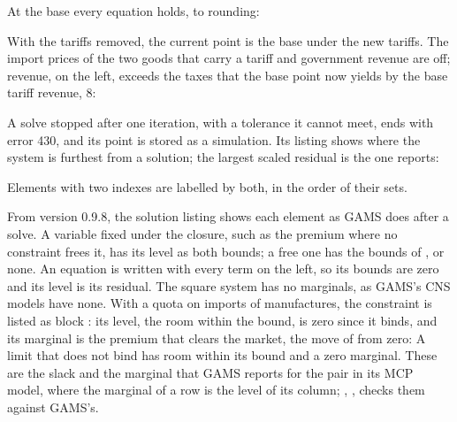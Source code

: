 At the base every equation holds, to rounding:


With the tariffs removed, the current point is the base under the new
tariffs. The import prices of the two goods that carry a tariff and
government revenue are off; revenue, on the left, exceeds the taxes that the
base point now yields by the base tariff revenue, 8:


A solve stopped after one iteration, with a tolerance it cannot meet, ends
with error 430, and its point is stored as a simulation. Its listing shows where the system is furthest from a
solution; the largest scaled residual is the one  reports:


Elements with two indexes are labelled by both, in the order of their sets.


From version 0.9.8, the solution listing shows each element as GAMS does
after a solve. A variable fixed under the closure, such as the premium
 where no constraint frees it, has its level as both bounds; a free one
has the bounds of , or none. An equation is written with
every term on the left, so its bounds are zero and its level is its residual.
The square system has no marginals, as GAMS's CNS models have none. With a
quota on imports of manufactures, the constraint is listed as block
: its level, the room within the bound, is zero since it binds, and
its marginal is the premium that clears the market, the move of
 from zero:
A limit that does not bind has room within its bound and a zero marginal. These
are the slack and the marginal that GAMS reports for the pair in its MCP model,
where the marginal of a row is the level of its column; ,
, checks them against GAMS's.


